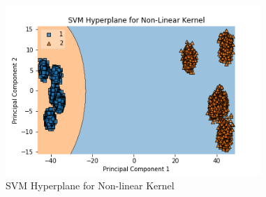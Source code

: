 \documentclass[journal,12pt,twocolumn]{IEEEtran}
\begin{document}
\begin{figure}[!h]
\begin{center}
\includegraphics[width=3.8in]{figs/HyperPlane_NLin.png}
\end{center}
\caption{SVM Hyperplane for Non-linear Kernel}
\label{fig: 3D Plot}
\end{figure}
\end{document}
